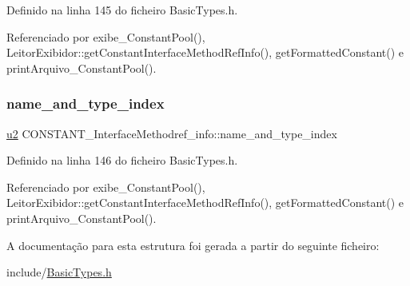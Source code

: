 Definido na linha 145 do ficheiro Basic\+Types.\+h.



Referenciado por exibe\+\_\+\+Constant\+Pool(), Leitor\+Exibidor\+::get\+Constant\+Interface\+Method\+Ref\+Info(), get\+Formatted\+Constant() e print\+Arquivo\+\_\+\+Constant\+Pool().

\mbox{\label{structCONSTANT__InterfaceMethodref__info_aeeb0a97e077fcbd839a67d7bb3ac6d5b}} 
\subsubsection{\texorpdfstring{name\+\_\+and\+\_\+type\+\_\+index}{name\_and\_type\_index}}
{\footnotesize\ttfamily \hyperlink{BasicTypes_8h_a732cde1300aafb73b0ea6c2558a7a54f}{u2} C\+O\+N\+S\+T\+A\+N\+T\+\_\+\+Interface\+Methodref\+\_\+info\+::name\+\_\+and\+\_\+type\+\_\+index}



Definido na linha 146 do ficheiro Basic\+Types.\+h.



Referenciado por exibe\+\_\+\+Constant\+Pool(), Leitor\+Exibidor\+::get\+Constant\+Interface\+Method\+Ref\+Info(), get\+Formatted\+Constant() e print\+Arquivo\+\_\+\+Constant\+Pool().



A documentação para esta estrutura foi gerada a partir do seguinte ficheiro\+:\begin{DoxyCompactItemize}
\item 
include/\hyperlink{BasicTypes_8h}{Basic\+Types.\+h}\end{DoxyCompactItemize}

